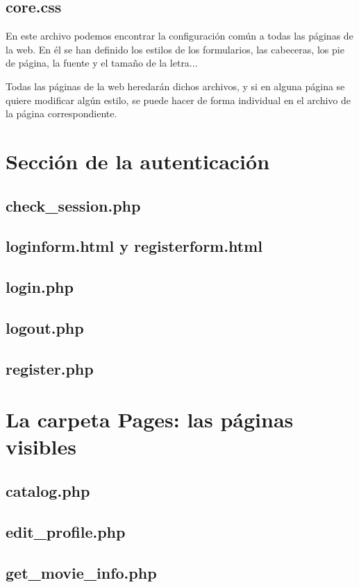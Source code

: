 \documentclass[a4paper, 12pt]{report}
\begin{document}
    \section{core.css}
    En este archivo podemos encontrar la configuración común a todas las páginas de la web. En él se han definido los estilos de los formularios, las cabeceras, los pie de página, la fuente y el tamaño de la letra...

    Todas las páginas de la web heredarán dichos archivos, y si en alguna página se quiere modificar algún estilo, se puede hacer de forma individual en el archivo de la página correspondiente.

    \chapter{Sección de la autenticación}
    \section{check\_session.php}
    \section{loginform.html y registerform.html}
    \section{login.php}
    \section{logout.php}
    \section{register.php}

    \chapter{La carpeta Pages: las páginas visibles}
    \section{catalog.php}
    \section{edit\_profile.php}
    \section{get\_movie\_info.php}
\end{document}
